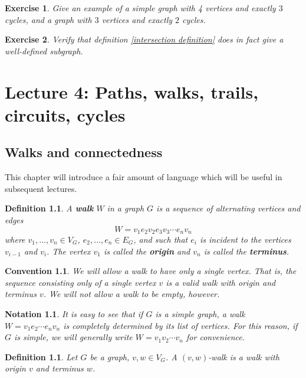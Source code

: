 \documentclass[12pt]{report}
\theoremstyle{plain}
\newtheorem{defn}[thm]{Definition}
\newtheorem{notn}[thm]{Notation}
\newtheorem{convention}[thm]{Convention}
\newtheorem{exercise}{Exercise}[section]
\newcommand{\Xb}[1]{\textbf{#1}\index{#1}}
\begin{document}
\begin{exercise}
Give an example of a simple graph with 4 vertices and exactly $3$ cycles, and a
graph with $3$ vertices and exactly $2$ cycles.
\end{exercise}

\begin{exercise}
Verify that definition \ref{intersection definition} does in fact give a
well-defined subgraph.
\end{exercise}



\chapter{Lecture 4: Paths, walks, trails, circuits, cycles}

\section{Walks and connectedness}

This chapter will introduce a fair amount of language which will be useful
in subsequent lectures. 

\begin{defn}
A \Xb{walk} $W$ in a graph $G$ is a sequence of alternating vertices and
edges
\[ W = v_1 e_2 v_2 e_3 v_3 \cdots e_n v_n \]
where $v_1, \ldots, v_n \in V_G$, $e_2, \ldots, e_n \in E_G$, and such that
$e_i$ is incident to the vertices $v_{i-1}$ and $v_i$. The vertex $v_1$ is
called the \textbf{origin} and $v_n$ is called
the \textbf{terminus}.
\end{defn}

\begin{convention}
We will allow a walk to have only a single vertex. That is, the sequence
consisting only of a single vertex $v$ is a valid walk with origin and
terminus $v$. We will not allow a walk to be empty, however.
\end{convention}

\begin{notn}
It is easy to see that if $G$ is a simple graph, a walk $W = v_1 e_2 \cdots
e_n v_n$ is completely determined by its list of vertices. For this reason,
if $G$ is simple, we will generally write $W = v_1 v_2 \cdots v_n$ for
convenience.
\end{notn}

\begin{defn}
Let $G$ be a graph, $v, w \in V_G$. A $(v, w)$-walk is a walk with origin
$v$ and terminus $w$.
\end{defn}
\end{document}
